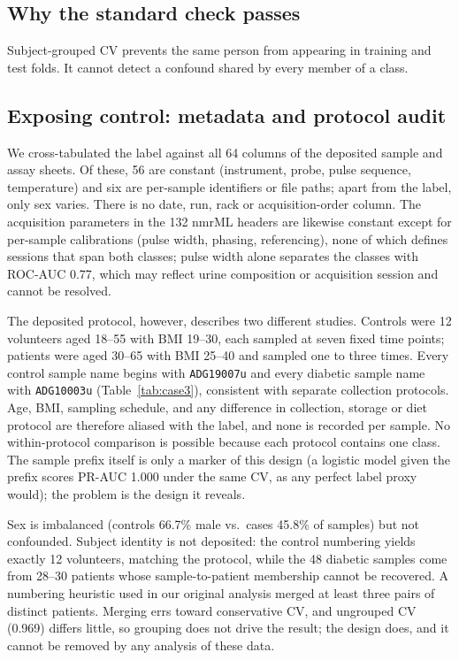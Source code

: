 \documentclass[conference]{IEEEtran}
\newcommand{\verified}[1]{#1}  %
\begin{document}
\subsection{Why the standard check passes}
Subject-grouped CV prevents the same person from appearing in training and
test folds. It cannot detect a confound shared by every member of a class.

\subsection{Exposing control: metadata and protocol audit}
We cross-tabulated the label against all 64 columns of the deposited sample
and assay sheets. Of these, 56 are constant (instrument, probe, pulse
sequence, temperature) and six are per-sample identifiers or file paths;
apart from the label, only sex varies. There is no date, run, rack or
acquisition-order column. The acquisition parameters in the 132 nmrML headers
are likewise constant except for per-sample calibrations (pulse width,
phasing, referencing), none of which defines sessions that span both classes;
pulse width alone separates the classes with ROC-AUC \verified{0.77}, which
may reflect urine composition or acquisition session and cannot be resolved.

The deposited protocol, however, describes two different studies. Controls
were 12 volunteers aged 18--55 with BMI 19--30, each sampled at seven fixed
time points; patients were aged 30--65 with BMI 25--40 and sampled one to
three times. Every control sample name begins with \verb|ADG19007u| and
every diabetic sample name with \verb|ADG10003u| (Table~\ref{tab:case3}),
consistent with separate collection protocols. Age, BMI, sampling schedule,
and any difference in collection, storage or diet protocol are therefore
aliased with the label, and none is recorded per sample. No within-protocol
comparison is possible because each protocol contains one class. The sample
prefix itself is only a marker of this design (a logistic model given the
prefix scores PR-AUC \verified{1.000} under the same CV, as any perfect
label proxy would); the problem is the design it reveals.

Sex is imbalanced (controls \verified{66.7\%} male vs.\ cases
\verified{45.8\%} of samples) but not confounded. Subject identity is not
deposited: the control numbering yields exactly 12 volunteers, matching the
protocol, while the 48 diabetic samples come from 28--30 patients whose
sample-to-patient membership cannot be recovered. A numbering heuristic used
in our original analysis merged at least three pairs of distinct patients.
Merging errs toward conservative CV, and ungrouped CV (\verified{0.969})
differs little, so grouping does not drive the result; the design does, and
it cannot be removed by any analysis of these data.
\end{document}
